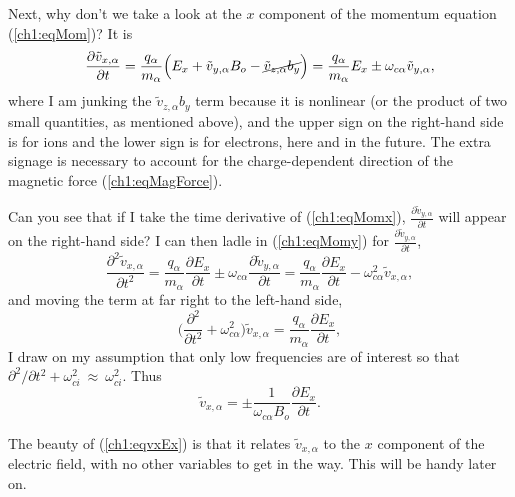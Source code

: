 Next, why don't we take a look at the $x$ component of the momentum equation
(\ref{ch1:eqMom})? It is
\begin{equation} \label{ch1:eqMomx} \dfrac{\partial \tilde v_{x,\alpha}}{\partial t} =
  \dfrac{q_\alpha}{m_\alpha} \Big ( E_x + \tilde v_{y,\alpha} B_o - \cancel{\tilde v_{z,\alpha} b_y}
  \Big ) = \dfrac{q_\alpha}{m_\alpha} E_x \pm \omega_{c \alpha} \tilde v_{y,\alpha},
\end{equation}
where I am junking the $\tilde v_{z,\alpha} b_y$ term because it is nonlinear
(or the product of two small quantities, as mentioned above), and the upper sign
on the right-hand side is for ions and the lower sign is for electrons, here and
in the future. The extra signage is necessary to account for the
charge-dependent direction of the magnetic force (\ref{ch1:eqMagForce}).

Can you see that if I take the time derivative of (\ref{ch1:eqMomx}),
$\frac{\partial \tilde v_{y,\alpha}}{\partial t}$ will appear on the right-hand
side?  I can then ladle in (\ref{ch1:eqMomy}) for
$\frac{\partial \tilde v_{y,\alpha}}{\partial t}$,
\begin{equation*} \label{ch1:eqMomxdt} \dfrac{\partial^2 \tilde
    v_{x,\alpha}}{\partial t^2} = \dfrac{q_\alpha}{m_\alpha}\dfrac{\partial
    E_x}{\partial t} \pm \omega_{c \alpha} \dfrac{\partial \tilde
    v_{y,\alpha}}{\partial t} = \dfrac{q_\alpha}{m_\alpha}\dfrac{\partial
    E_x}{\partial t} - \omega_{c \alpha}^2 \tilde v_{x,\alpha},
\end{equation*}
and moving the term at far right to the left-hand side,
\begin{equation*} \Big ( \dfrac{\partial^2}{\partial t^2} + \omega_{c \alpha}^2
  \Big ) \tilde v_{x,\alpha} = \dfrac{q_\alpha}{m_\alpha}\dfrac{\partial E_x}{\partial
    t},
\end{equation*}
I draw on my assumption that only low frequencies are of interest so that
$\partial^2 / \partial t^2 + \omega_{c i}^2~\approx~\omega_{c i}^2$. Thus
\begin{equation} \label{ch1:eqvxEx}
  \tilde v_{x,\alpha} = \pm \dfrac{1}{\omega_{c \alpha} B_o}\dfrac{\partial
    E_x}{\partial t}.
\end{equation}

The beauty of (\ref{ch1:eqvxEx}) is that it relates $\tilde v_{x,\alpha}$ to the
$x$ component of the electric field, with no other variables to get in the
way. This will be handy later on.

